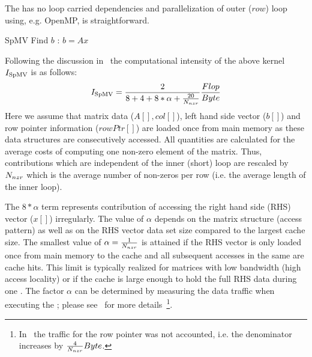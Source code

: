 \subsubsection{\SpMV}
The \SpMV has no loop carried dependencies and parallelization of outer ($row$) loop using, e.g. OpenMP, is straightforward. 
\begin{algorithm}[H]
	\caption{SpMV Find $b$ : $b=A x$} 
	\label{alg:SpMV}
	\begin{algorithmic}[1]
		\ENDFOR
		\ENDFOR
	\end{algorithmic}
\end{algorithm}
Following the discussion in~\cite{Moritz_sell} the computational intensity of the above kernel $I_\mathrm{SpMV}$  is as follows:
\begin{equation}
\label{eq:SpMV_intensity}
I_\mathrm{\SpMV} = \frac{2}{8+4+8*\alpha+\frac{20}{\NNZRmath}} \frac{Flop}{Byte} \\
\end{equation}
Here we assume that matrix data  ($A[], col[]$), left hand side vector ($b[]$) and row pointer information ($rowPtr[]$) are loaded once from main memory as these data structures are consecutively accessed. All quantities are calculated for the average costs of computing one non-zero element of the matrix. Thus, contributions which are independent of the inner (short) loop are rescaled by $N_{nzr}$ which is the average number of non-zeros per row (i.e. the average length of the inner loop).

The $8*\alpha$ term represents contribution of accessing the right hand side (RHS) vector ($x[]$) irregularly. The value of $\alpha$ depends on the matrix structure (access pattern) as well as on the RHS vector data set size compared to the largest cache size. The smallest value of $\alpha=\frac{1}{N_{nzr}}$ is attained if the RHS vector is only loaded once from main memory to the cache and all subsequent accesses in the same \SpMV are cache hits. This limit is typically realized for matrices with low bandwidth (high access locality) or if the cache is large enough to hold the full RHS data during one \SpMV. The factor $\alpha$ can be determined by measuring the data traffic when executing the \SpMV; please see~\cite{Moritz_sell} for more details~\footnote{In~\cite{Moritz_sell} the traffic for the row pointer was not accounted, i.e. the denominator increases by $\frac{4}{N_{nzr}} Byte$.}.


